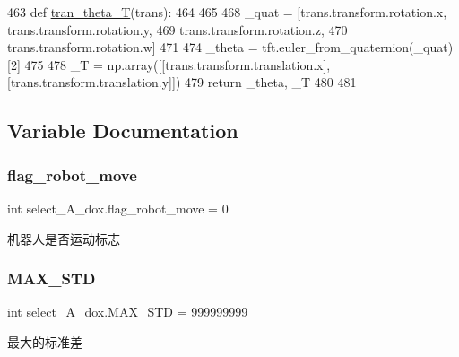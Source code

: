 \begin{DoxyCode}
463 \textcolor{keyword}{def }\hyperlink{namespaceselect___a__dox_a62a8e3ea1a92df75e0ca42190f621777}{tran\_theta\_T}(trans):
464 
465     
468     \_quat = [trans.transform.rotation.x, trans.transform.rotation.y,
469              trans.transform.rotation.z,
470              trans.transform.rotation.w]
471     
474     \_theta = tft.euler\_from\_quaternion(\_quat)[2]
475     
478     \_T = np.array([[trans.transform.translation.x], [trans.transform.translation.y]])
479     \textcolor{keywordflow}{return} \_theta, \_T
480 
481 
\end{DoxyCode}


\subsection{Variable Documentation}
\mbox{\label{namespaceselect___a__dox_aab650782f9bf9e653748df1ce43ba0a3}} 
\subsubsection{\texorpdfstring{flag\+\_\+robot\+\_\+move}{flag\_robot\_move}}
{\footnotesize\ttfamily int select\+\_\+\+A\+\_\+dox.\+flag\+\_\+robot\+\_\+move = 0}



机器人是否运动标志 

\mbox{\label{namespaceselect___a__dox_ae625bd87a3d659c478623a68cd8419a0}} 
\subsubsection{\texorpdfstring{M\+A\+X\+\_\+\+S\+TD}{MAX\_STD}}
{\footnotesize\ttfamily int select\+\_\+\+A\+\_\+dox.\+M\+A\+X\+\_\+\+S\+TD = 999999999}



最大的标准差 

\mbox{\label{namespaceselect___a__dox_a8c2c2dd96dd9f11315bf9092c248b7f6}} 
